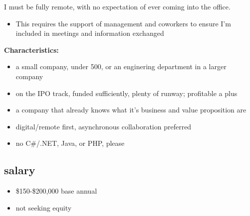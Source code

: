 \documentclass[
]{article}
\providecommand{\tightlist}{%
  \setlength{\itemsep}{0pt}\setlength{\parskip}{0pt}}
\begin{document}
I must be fully remote, with no expectation of ever coming into the
office.

\begin{itemize}
\tightlist
\item
  This requires the support of management and coworkers to ensure I'm
  included in meetings and information exchanged
\end{itemize}

\textbf{Characteristics:}

\begin{itemize}
\tightlist
\item
  a small company, under 500, or an enginering department in a larger
  company
\item
  on the IPO track, funded sufficiently, plenty of runway; profitable a
  plus
\item
  a company that already knows what it's business and value proposition
  are
\item
  digital/remote first, asynchronous collaboration preferred
\item
  no C\#/.NET, Java, or PHP, please
\end{itemize}

\subsection{salary}\label{salary}

\begin{itemize}
\tightlist
\item
  \$150-\$200,000 base annual
\item
  not seeking equity
\end{itemize}
\end{document}
